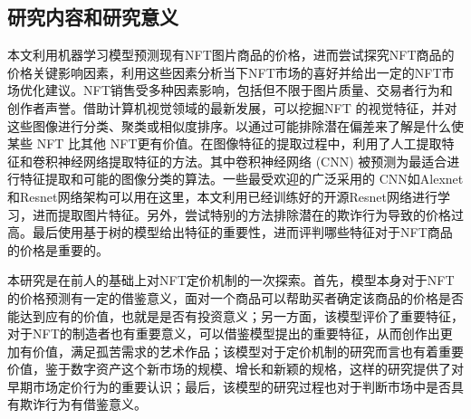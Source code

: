\documentclass{article}
\begin{document}
\subsection{研究内容和研究意义}
\par
本文利用机器学习模型预测现有NFT图片商品的价格，进而尝试探究NFT商品的价格关键影响因素，利用这些因素分析当下NFT市场的喜好并给出一定的NFT市场优化建议。NFT销售受多种因素影响\cite{两页NFT价格预测}，包括但不限于图片质量、交易者行为和创作者声誉。借助计算机视觉领域的最新发展，可以挖掘NFT 的视觉特征，并对这些图像进行分类、聚类或相似度排序。以通过可能排除潜在偏差来了解是什么使某些 NFT 比其他 NFT更有价值。在图像特征的提取过程中，利用了人工提取特征和卷积神经网络提取特征的方法。其中卷积神经网络 (CNN) 被预测为最适合进行特征提取和可能的图像分类的算法。一些最受欢迎的广泛采用的 CNN如Alexnet和Resnet网络架构可以用在这里，本文利用已经训练好的开源Resnet网络进行学习，进而提取图片特征。另外，尝试特别的方法排除潜在的欺诈行为导致的价格过高。最后使用基于树的模型给出特征的重要性，进而评判哪些特征对于NFT商品的价格是重要的。
\par 本研究是在前人的基础上对NFT定价机制的一次探索。首先，模型本身对于NFT的价格预测有一定的借鉴意义，面对一个商品可以帮助买者确定该商品的价格是否能达到应有的价值，也就是是否有投资意义；另一方面，该模型评价了重要特征，对于NFT的制造者也有重要意义，可以借鉴模型提出的重要特征，从而创作出更加有价值，满足孤苦需求的艺术作品；该模型对于定价机制的研究而言也有着重要价值，鉴于数字资产这个新市场的规模、增长和新颖的规格，这样的研究提供了对早期市场定价行为的重要认识；最后，该模型的研究过程也对于判断市场中是否具有欺诈行为有借鉴意义。
\end{document}
